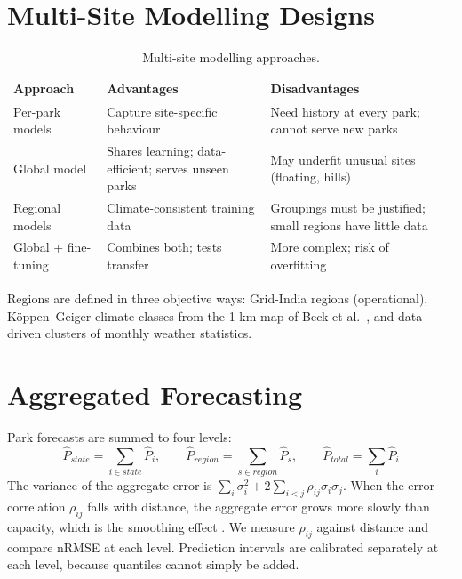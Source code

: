 \documentclass[12pt]{report}
\begin{document}
\section{Multi-Site Modelling Designs}
\vspace{1mm}
\begin{table}[htbp]
\centering
\caption{Multi-site modelling approaches.}
\label{tab:multisite}
\begin{tabularx}{\textwidth}{p{3cm}LL}
\toprule
Approach & Advantages & Disadvantages \\
\midrule
Per-park models & Capture site-specific behaviour & Need history at every park; cannot serve new parks \\
Global model & Shares learning; data-efficient; serves unseen parks & May underfit unusual sites (floating, hills) \\
Regional models & Climate-consistent training data & Groupings must be justified; small regions have little data \\
Global + fine-tuning & Combines both; tests transfer & More complex; risk of overfitting \\
\bottomrule
\end{tabularx}
\end{table}
Regions are defined in three objective ways: Grid-India regions (operational), Köppen--Geiger climate classes from the 1-km map of Beck et al.\ \cite{beck2018}, and data-driven clusters of monthly weather statistics.

\section{Aggregated Forecasting}
\vspace{1mm}
Park forecasts are summed to four levels:
\begin{equation}
    \hat{P}_{state} = \sum_{i \in state} \hat{P}_i, \qquad \hat{P}_{region} = \sum_{s \in region} \hat{P}_s, \qquad \hat{P}_{total} = \sum_i \hat{P}_i
\end{equation}
The variance of the aggregate error is $\sum_i \sigma_i^2 + 2\sum_{i<j}\rho_{ij}\sigma_i\sigma_j$. When the error correlation $\rho_{ij}$ falls with distance, the aggregate error grows more slowly than capacity, which is the smoothing effect \cite{hoff2010}. We measure $\rho_{ij}$ against distance and compare nRMSE at each level. Prediction intervals are calibrated separately at each level, because quantiles cannot simply be added.
\end{document}

